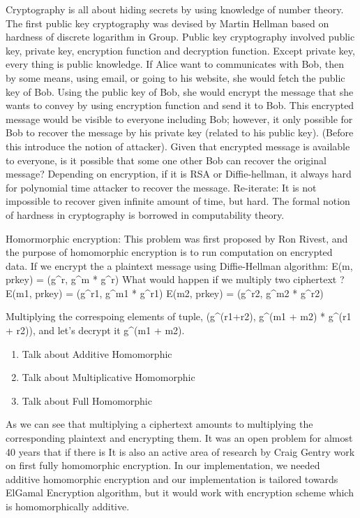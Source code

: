  Cryptography is all about hiding secrets by using knowledge of number theory. The first public key cryptography
 was devised by Martin Hellman based on hardness of discrete logarithm in Group. Public key cryptography 
 involved public key, private key, encryption function and decryption function. Except private key, every
 thing is public knowledge.  If Alice want to communicates with Bob, then by some means, using email, or going to his website, 
 she would fetch the public key of Bob. Using the public key of Bob, she would encrypt the message that she wants to convey by using 
 encryption function and send 
 it to Bob. This encrypted message would be visible to everyone including Bob; however, it only possible for Bob to recover the 
 message by his private key (related to his public key). (Before this introduce the notion of attacker). 
 Given that encrypted message is available to everyone, is it possible that some one other Bob can recover the original 
 message?  Depending on encryption, if it is RSA or Diffie-hellman, it always hard for polynomial time attacker to recover 
 the message. Re-iterate: It is not impossible to recover given infinite amount of time, but hard. The formal notion of 
 hardness in cryptography is borrowed in computability theory. 
 
 
 Homormorphic encryption: 
 This problem was first proposed by Ron Rivest, and the purpose of homomorphic encryption is to run computation on encrypted data. 
  If we encrypt the a plaintext message using Diffie-Hellman algorithm:
  E(m, prkey) = (g^r, g^m * g^r) 
  What would happen if we multiply two ciphertext ? 
  E(m1, prkey) = (g^r1, g^m1 * g^r1) 
  E(m2, prkey)  = (g^r2, g^m2 * g^r2)
  
  Multiplying the correspoing elements of tuple, (g^(r1+r2), g^(m1 + m2) * g^(r1 + r2)), and let's decrypt it
  g^(m1 + m2). 
  
  \begin{enumerate}
  \item Talk about Additive Homomorphic 
  \item Talk about Multiplicative Homomorphic
  \item Talk about Full Homomorphic
  \end{enumerate}
  
  As we can see that multiplying a ciphertext amounts to multiplying the corresponding plaintext and encrypting them. 
  It was an open problem for almost 40 years that if there is 
  It is also an active area of research by Craig Gentry work on first fully homomorphic encryption. 
  In our implementation, we needed additive homomorphic encryption and our implementation is tailored towards 
  ElGamal Encryption algorithm, but it would work with encryption scheme which is homomorphically additive. 
  
